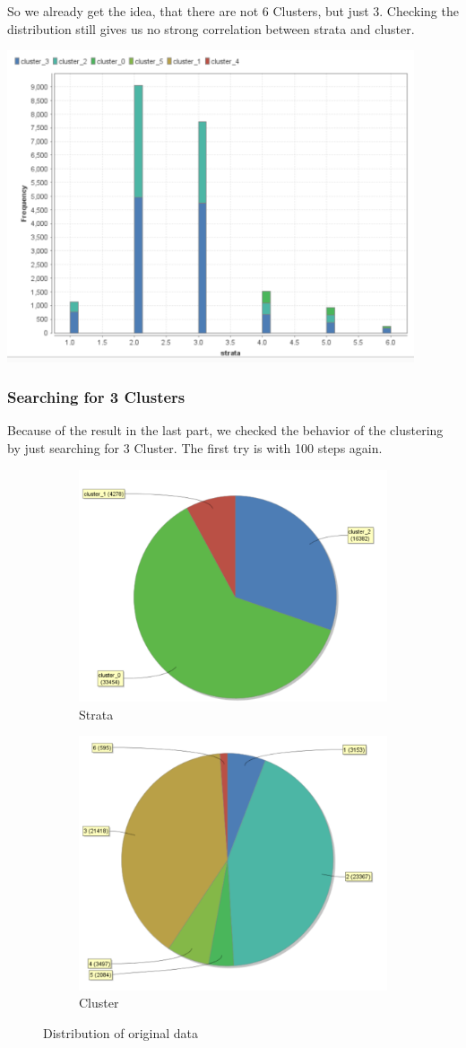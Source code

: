 So we already get the idea, that there are not 6 Clusters, but just 3. Checking the distribution still gives us no strong correlation between strata and cluster.

\includegraphics[width=0.9\textwidth]{vectorClustering1000}

\subsubsection{Searching for 3 Clusters}

Because of the result in the last part, we checked the behavior of the clustering by just searching for 3 Cluster. The first try is with 100 steps again.

\begin{figure}[h]
\centering
\begin{subfigure}{.5\textwidth}
  \centering
  \includegraphics[width=.4\linewidth]{vectorclusteringcluster3Cluster.PNG}
  \caption{Strata}
  \label{fig:OrgSt}
\end{subfigure}%
\begin{subfigure}{.5\textwidth}
  \centering
  \includegraphics[width=.4\linewidth]{vectorclusteringstrata.PNG}
  \caption{Cluster}
  \label{fig:OrgCl}
\end{subfigure}
\caption{Distribution of original data}
\label{fig:OrgDist}
\end{figure}

